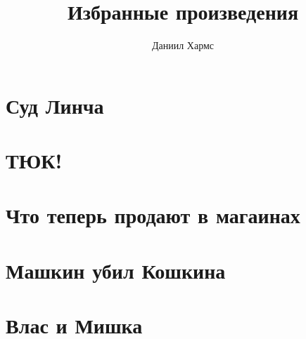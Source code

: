 \documentclass[a4paper, 12pt]{article}
\begin{document}
    \title{Избранные произведения}
    \author{Даниил Хармс}

    \maketitle
    
    \section*{Суд Линча}
    

    \section*{ТЮК!}
    

    \section*{Что теперь продают в магаинах}
    

    \section*{Машкин убил Кошкина}
    

    \section*{Влас и Мишка}
    
\end{document}
